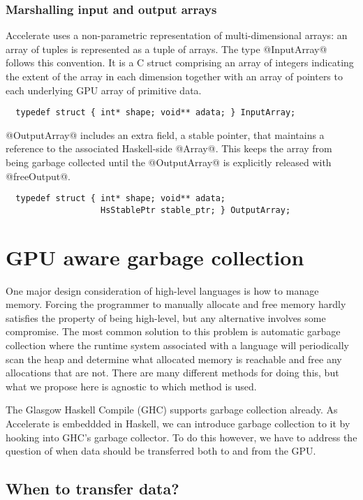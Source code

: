 \subsubsection{Marshalling input and output arrays}

Accelerate uses a non-parametric representation of multi-dimensional arrays: an array of tuples is represented as a tuple of arrays. The type @InputArray@ follows this convention. It is a C struct comprising an array of integers indicating the extent of the array in each dimension together with an array of pointers to each underlying GPU array of primitive data.
%
\begin{lstlisting}
  typedef struct { int* shape; void** adata; } InputArray;
\end{lstlisting}
%

@OutputArray@ includes an extra field, a stable pointer, that maintains a reference to the associated Haskell-side @Array@. This keeps the array from being garbage collected until the @OutputArray@ is explicitly released with @freeOutput@.
%
\begin{lstlisting}
  typedef struct { int* shape; void** adata;
                   HsStablePtr stable_ptr; } OutputArray;
\end{lstlisting}
%


\section{GPU aware garbage collection}
\label{sec:gpu-gc}

One major design consideration of high-level languages is how to manage memory. Forcing the programmer to manually allocate and free memory hardly satisfies the property of being high-level, but any alternative involves some compromise. The most common solution to this problem is automatic garbage collection where the runtime system associated with a language will periodically scan the heap and determine what allocated memory is reachable and free any allocations that are not. There are many different methods for doing this, but what we propose here is agnostic to which method is used.

The Glasgow Haskell Compile (GHC) supports garbage collection already. As Accelerate is embeddded in Haskell, we can introduce garbage collection to it by hooking into GHC's garbage collector. To do this however, we have to address the question of when data should be transferred both to and from the GPU.

\subsection{When to transfer data?}


